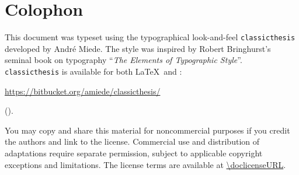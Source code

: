 \pagestyle{empty}

\hfill

\vfill

\section*{Colophon}
This document was typeset using the typographical look-and-feel \texttt{classicthesis} developed by Andr\'e Miede. 
The style was inspired by Robert Bringhurst's seminal book on typography ``\emph{The Elements of Typographic Style}''. 
\texttt{classicthesis} is available for both \LaTeX\ and \mLyX: 
\begin{center}
\url{https://bitbucket.org/amiede/classicthesis/}
\end{center}

\begin{spacedparagraphs}
\doclicenseImage

\myLicenseNotice{} (\doclicenseName).

You may copy and share this material for noncommercial purposes if you credit
the authors and link to the license. Commercial use and distribution of
adaptations require separate permission, subject to applicable copyright
exceptions and limitations. The license terms are available at
\expandafter\url\expandafter{\doclicenseURL}.
\end{spacedparagraphs}
